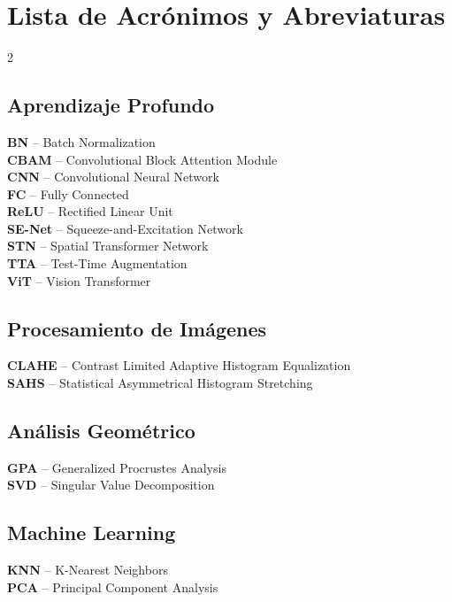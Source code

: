 
\section*{Lista de Acrónimos y Abreviaturas}

\begin{multicols}{2}
\small
\setlength{\parskip}{0.3em}

\subsection*{Aprendizaje Profundo}
\textbf{BN} -- Batch Normalization \\
\textbf{CBAM} -- Convolutional Block Attention Module \\
\textbf{CNN} -- Convolutional Neural Network \\
\textbf{FC} -- Fully Connected \\
\textbf{ReLU} -- Rectified Linear Unit \\
\textbf{SE-Net} -- Squeeze-and-Excitation Network \\
\textbf{STN} -- Spatial Transformer Network \\
\textbf{TTA} -- Test-Time Augmentation \\
\textbf{ViT} -- Vision Transformer

\subsection*{Procesamiento de Imágenes}
\textbf{CLAHE} -- Contrast Limited Adaptive Histogram Equalization \\
\textbf{SAHS} -- Statistical Asymmetrical Histogram Stretching

\subsection*{Análisis Geométrico}
\textbf{GPA} -- Generalized Procrustes Analysis \\
\textbf{SVD} -- Singular Value Decomposition

\subsection*{Machine Learning}
\textbf{KNN} -- K-Nearest Neighbors \\
\textbf{PCA} -- Principal Component Analysis


\end{multicols}
